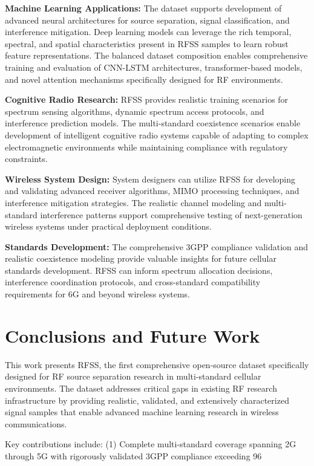 \documentclass[twocolumn]{article}
\begin{document}
\textbf{Machine Learning Applications:} The dataset supports development of advanced neural architectures for source separation, signal classification, and interference mitigation. Deep learning models can leverage the rich temporal, spectral, and spatial characteristics present in RFSS samples to learn robust feature representations. The balanced dataset composition enables comprehensive training and evaluation of CNN-LSTM architectures, transformer-based models, and novel attention mechanisms specifically designed for RF environments.

\textbf{Cognitive Radio Research:} RFSS provides realistic training scenarios for spectrum sensing algorithms, dynamic spectrum access protocols, and interference prediction models. The multi-standard coexistence scenarios enable development of intelligent cognitive radio systems capable of adapting to complex electromagnetic environments while maintaining compliance with regulatory constraints.

\textbf{Wireless System Design:} System designers can utilize RFSS for developing and validating advanced receiver algorithms, MIMO processing techniques, and interference mitigation strategies. The realistic channel modeling and multi-standard interference patterns support comprehensive testing of next-generation wireless systems under practical deployment conditions.

\textbf{Standards Development:} The comprehensive 3GPP compliance validation and realistic coexistence modeling provide valuable insights for future cellular standards development. RFSS can inform spectrum allocation decisions, interference coordination protocols, and cross-standard compatibility requirements for 6G and beyond wireless systems.

\section{Conclusions and Future Work}

This work presents RFSS, the first comprehensive open-source dataset specifically designed for RF source separation research in multi-standard cellular environments. The dataset addresses critical gaps in existing RF research infrastructure by providing realistic, validated, and extensively characterized signal samples that enable advanced machine learning research in wireless communications.

Key contributions include: (1) Complete multi-standard coverage spanning 2G through 5G with rigorously validated 3GPP compliance exceeding 96%
\end{document}
